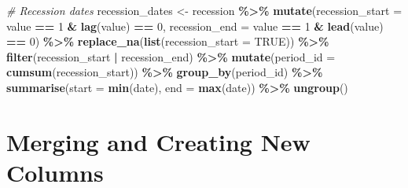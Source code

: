 \documentclass[
]{article}
\newenvironment{Shaded}{\begin{snugshade}}{\end{snugshade}}
\newcommand{\AttributeTok}[1]{\textcolor[rgb]{0.13,0.29,0.53}{#1}}
\newcommand{\CommentTok}[1]{\textcolor[rgb]{0.56,0.35,0.01}{\textit{#1}}}
\newcommand{\ConstantTok}[1]{\textcolor[rgb]{0.56,0.35,0.01}{#1}}
\newcommand{\DecValTok}[1]{\textcolor[rgb]{0.00,0.00,0.81}{#1}}
\newcommand{\FunctionTok}[1]{\textcolor[rgb]{0.13,0.29,0.53}{\textbf{#1}}}
\newcommand{\NormalTok}[1]{#1}
\newcommand{\OtherTok}[1]{\textcolor[rgb]{0.56,0.35,0.01}{#1}}
\newcommand{\SpecialCharTok}[1]{\textcolor[rgb]{0.81,0.36,0.00}{\textbf{#1}}}
\begin{document}
\begin{Shaded}
\begin{Highlighting}[]
\CommentTok{\# Recession dates}
\NormalTok{recession\_dates }\OtherTok{\textless{}{-}}\NormalTok{ recession }\SpecialCharTok{\%\textgreater{}\%}
  \FunctionTok{mutate}\NormalTok{(}\AttributeTok{recession\_start =}\NormalTok{ value }\SpecialCharTok{==} \DecValTok{1} \SpecialCharTok{\&} \FunctionTok{lag}\NormalTok{(value) }\SpecialCharTok{==} \DecValTok{0}\NormalTok{,}
         \AttributeTok{recession\_end =}\NormalTok{ value }\SpecialCharTok{==} \DecValTok{1} \SpecialCharTok{\&} \FunctionTok{lead}\NormalTok{(value) }\SpecialCharTok{==} \DecValTok{0}\NormalTok{) }\SpecialCharTok{\%\textgreater{}\%}
  \FunctionTok{replace\_na}\NormalTok{(}\FunctionTok{list}\NormalTok{(}\AttributeTok{recession\_start =} \ConstantTok{TRUE}\NormalTok{)) }\SpecialCharTok{\%\textgreater{}\%}
  \FunctionTok{filter}\NormalTok{(recession\_start }\SpecialCharTok{|}\NormalTok{ recession\_end) }\SpecialCharTok{\%\textgreater{}\%}
  \FunctionTok{mutate}\NormalTok{(}\AttributeTok{period\_id =} \FunctionTok{cumsum}\NormalTok{(recession\_start)) }\SpecialCharTok{\%\textgreater{}\%}
  \FunctionTok{group\_by}\NormalTok{(period\_id) }\SpecialCharTok{\%\textgreater{}\%}
  \FunctionTok{summarise}\NormalTok{(}\AttributeTok{start =} \FunctionTok{min}\NormalTok{(date), }\AttributeTok{end =} \FunctionTok{max}\NormalTok{(date)) }\SpecialCharTok{\%\textgreater{}\%}
  \FunctionTok{ungroup}\NormalTok{()}
\end{Highlighting}
\end{Shaded}

\section{Merging and Creating New
Columns}\label{merging-and-creating-new-columns}
\end{document}
